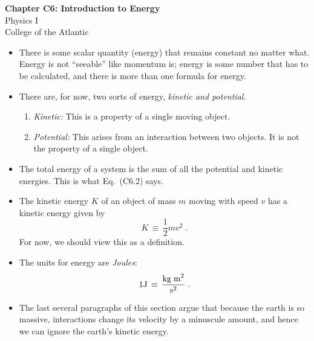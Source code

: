 \documentclass[12pt]{article}
\begin{document}
\pagestyle{empty}

\begin{center}
{\Large {\bf Chapter C6: Introduction to Energy}}\\
\medskip
{\large {Physics I}}\\
\medskip
College of the Atlantic\\
\end{center}
\medskip


\begin{itemize}
\item %
There is some scalar quantity (energy) that remains constant no matter
what.  Energy is not ``seeable'' like momentum is; energy is some
number that has to be calculated, and there is more than one formula
for energy. 
\item There are, for now, two sorts of energy, {\em kinetic and
potential}.
\begin{enumerate}
    \item {\em Kinetic:}  This is a property of a single moving object.  
    \item {\em Potential:} This arises from an interaction between two
    objects.  It is not the property of a single object.
\end{enumerate}
\item The total energy of a system is the sum of all the potential and
kinetic energies.  This is what Eq.~(C6.2) says.\\
\end{itemize}


\begin{itemize}

\item The kinetic energy $K$ of an object of mass $m$ moving with
speed $v$ has a kinetic energy given by 
\begin{equation}
K \, \equiv \, \frac{1}{2}mv^2 \; .
\end{equation}  
For now, we should view this as a definition. 
\item The units for energy are {\em Joules}:
\begin{equation}
1 {\rm J} \, \equiv \, \frac{ {\rm kg \; m}^{2}}{ {\rm s}^2} \;.
\end{equation}
\item The last several paragraphs of this section argue that because
  the earth is so massive, interactions change its velocity by a
  minuscule amount, and hence we can ignore the earth's kinetic
  energy. \\

\end{itemize}
\newpage
{}
\end{document}
